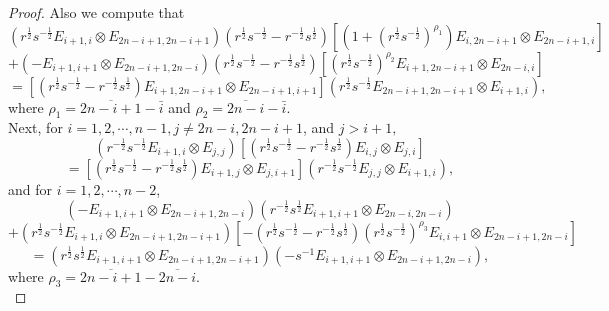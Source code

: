 \documentclass[10pt,a4paper]{amsart}
\numberwithin{equation}{section}
\begin{document}
\begin{proof}
Also we compute that
$$
\left(r^{\frac{1}{2}} s^{-\frac{1}{2}} E_{i+1, i} \otimes E_{2 n-i+1,2 n-i+1}\right)\left(r^{\frac{1}{2}} s^{-\frac{1}{2}}-r^{-\frac{1}{2}} s^{\frac{1}{2}}\right)\left[\left(1+\left(r^{\frac{1}{2}} s^{-\frac{1}{2}}\right)^{\rho_1}\right) E_{i, 2 n-i+1} \otimes E_{2 n-i+1, i}\right]
$$
$$
+\left(-E_{i+1, i+1} \otimes E_{2 n-i+1,2 n-i}\right)\left(r^{\frac{1}{2}} s^{-\frac{1}{2}}-r^{-\frac{1}{2}} s^{\frac{1}{2}}\right)\left[\left(r^{\frac{1}{2}} s^{-\frac{1}{2}}\right)^{\rho_2} E_{i+1,2 n-i+1} \otimes E_{2 n-i, i}\right]
$$
$$
=\left[\left(r^{\frac{1}{2}} s^{-\frac{1}{2}}-r^{-\frac{1}{2}} s^{\frac{1}{2}}\right) E_{i+1,2 n-i+1} \otimes E_{2 n-i+1, i+1}\right]\left(r^{\frac{1}{2}} s^{-\frac{1}{2}} E_{2 n-i+1,2 n-i+1} \otimes E_{i+1, i}\right),
$$
where $
\rho_1=\overline{2 n-i+1}-\bar{i}$ and $\rho_2=\overline{2 n-i}-\bar{i}.$\\

Next, for $i=1,2, \cdots ,n-1, j \neq 2 n-i, 2 n-i+1$, and $j>i+1,$
$$
\left(r^{-\frac{1}{2}} s^{-\frac{1}{2}} E_{i+1, i} \otimes E_{j, j}\right)\left[\left(r^{\frac{1}{2}} s^{-\frac{1}{2}}-r^{-\frac{1}{2}} s^{\frac{1}{2}}\right) E_{i, j} \otimes E_{j, i}\right]
$$
$$
=\left[\left(r^{\frac{1}{2}} s^{-\frac{1}{2}}-r^{-\frac{1}{2}} s^{\frac{1}{2}}\right) E_{i+1, j} \otimes E_{j, i+1}\right]\left(r^{-\frac{1}{2}} s^{-\frac{1}{2}} E_{j, j} \otimes E_{i+1, i}\right),
$$
and for $i=1,2, \cdots ,n-2$,
$$
\left(-E_{i+1, i+1} \otimes E_{2 n-i+1,2 n-i}\right)\left(r^{-\frac{1}{2}} s^{\frac{1}{2}} E_{i+1, i+1} \otimes E_{2 n-i, 2 n-i}\right)
$$
$$
+\left(r^{\frac{1}{2}} s^{-\frac{1}{2}} E_{i+1, i} \otimes E_{2 n-i+1,2 n-i+1}\right)\left[-\left(r^{\frac{1}{2}} s^{-\frac{1}{2}}-r^{-\frac{1}{2}} s^{\frac{1}{2}}\right)\left(r^{\frac{1}{2}} s^{-\frac{1}{2}}\right)^{\rho_3} E_{i, i+1} \otimes E_{2 n-i+1,2 n-i}\right]
$$
$$
=\left(r^{\frac{1}{2}} s^{\frac{1}{2}} E_{i+1, i+1} \otimes E_{2 n-i+1,2 n-i+1}\right)\left(-s^{-1} E_{i+1, i+1} \otimes E_{2 n-i+1,2 n-i}\right),
$$
where $\rho_3=\overline{2 n-i+1}-\overline{2 n-i}.$\\


\end{proof}
\end{document}
